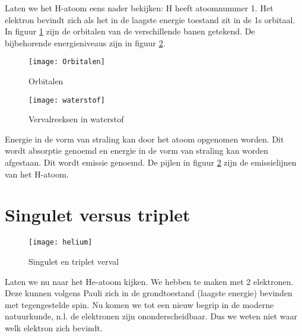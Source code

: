 Laten we het H-atoom eens nader bekijken: H heeft atoomnummer 1. Het
elektron bevindt zich als het in de laagste energie toestand zit in
de 1s orbitaal. In figuur \ref{fig:Orbitalen} zijn de orbitalen van
de verschillende banen getekend. De bijbehorende energieniveaus zijn
in figuur \ref{fig:Energieniveaux}.

\begin{figure}[h]
\noindent \begin{centering}
\texttt{[image: Orbitalen]}
\par\end{centering}

\caption{\label{fig:Orbitalen}Orbitalen}
\end{figure}


\begin{figure}[h]
\noindent \begin{centering}
\texttt{[image: waterstof]}
\par\end{centering}

\caption{\label{fig:Energieniveaux}Vervalreeksen in waterstof}
\end{figure}


Energie in de vorm van straling kan door het atoom opgenomen worden.
Dit wordt absorptie genoemd en energie in de vorm van straling kan
worden afgestaan. Dit wordt emissie genoemd. De pijlen in figuur \ref{fig:Energieniveaux}
zijn de emissielijnen van het H-atoom. 


\section{Singulet versus triplet}

\begin{figure}[h]
\noindent \begin{centering}
\texttt{[image: helium]}
\par\end{centering}

\caption{\label{fig:Singulet-en-triplet}Singulet en triplet verval}
\end{figure}


Laten we nu naar het He-atoom kijken. We hebben te maken met 2 elektronen.
Deze kunnen volgens Pauli zich in de grondtoestand (laagste energie)
bevinden met tegengestelde spin. Nu komen we tot een nieuw begrip
in de moderne natuurkunde, n.l. de elektronen zijn ononderscheidbaar.
Dus we weten niet waar welk elektron zich bevindt.

